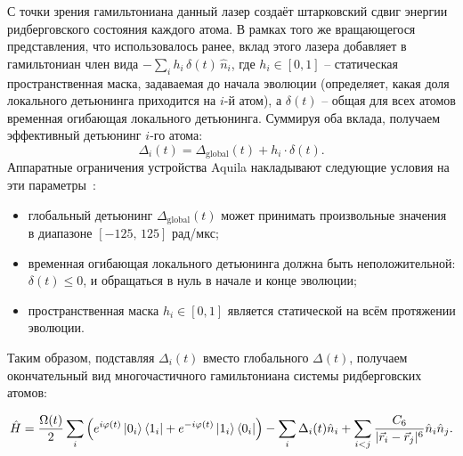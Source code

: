 С точки зрения гамильтониана данный лазер создаёт штарковский сдвиг энергии ридберговского состояния каждого атома.
В рамках того же вращающегося представления, что использовалось ранее, вклад этого лазера добавляет в гамильтониан член вида
$-\sum_i h_i \, \delta(t) \, \hat{n}_i$, где $h_i \in [0, 1]$ -- статическая пространственная маска, задаваемая до начала эволюции
(определяет, какая доля локального детьюнинга приходится на $i$-й атом), а $\delta(t)$ -- общая для всех атомов временная огибающая локального детьюнинга.
Суммируя оба вклада, получаем эффективный детьюнинг $i$-го атома:
\begin{equation}
    \Delta_i(t) = \Delta_{\mathrm{global}}(t) + h_i \cdot \delta(t).
\end{equation}
Аппаратные ограничения устройства Aquila накладывают следующие условия на эти параметры~\cite{wurtz2023aquila}:
\begin{itemize}
    \item глобальный детьюнинг $\Delta_{\mathrm{global}}(t)$ может принимать произвольные значения в диапазоне $[-125,\, 125]$ рад/мкс;
    \item временная огибающая локального детьюнинга должна быть неположительной: $\delta(t) \leq 0$, и обращаться в нуль в начале и конце эволюции;
    \item пространственная маска $h_i \in [0, 1]$ является статической на всём протяжении эволюции.
\end{itemize}
Таким образом, подставляя $\Delta_i(t)$ вместо глобального $\Delta(t)$, получаем окончательный вид многочастичного гамильтониана системы ридберговских атомов:

\begin{equation}
    \hat{H} = \frac{\Omega(t)}{2} \sum_{i} \left(e^{i \varphi(t)} \ket{0_i} \bra{1_i} + e^{-i \varphi(t)} \ket{1_i} \bra{0_i} \right) -  \sum_i \Delta_i(t) \hat{n}_i + \sum_{i < j} \frac{C_6}{|\vec{r}_i - \vec{r}_j|^6} \hat{n}_i \hat{n}_j.
\end{equation}
